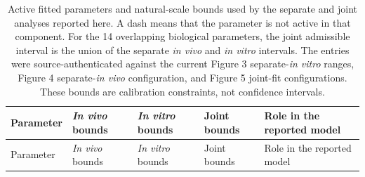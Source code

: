 \begingroup
\scriptsize
\setlength{\tabcolsep}{3pt}
\setlength\LTleft{0pt}
\setlength\LTright{0pt}
\begin{longtable}{@{}p{}p{}p{}p{}p{}@{}}
\caption{Active fitted parameters and natural-scale bounds used by the separate and joint analyses reported here. A dash means that the parameter is not active in that component. For the 14 overlapping biological parameters, the joint admissible interval is the union of the separate \textit{in vivo} and \textit{in vitro} intervals. The entries were source-authenticated against the current Figure 3 separate-\textit{in vitro} ranges, Figure 4 separate-\textit{in vivo} configuration, and Figure 5 joint-fit configurations. These bounds are calibration constraints, not confidence intervals.}
\label{tab:tao_model_parameters}\\

\toprule
Parameter & \textit{In vivo} bounds & \textit{In vitro} bounds & Joint bounds & Role in the reported model \\
\midrule
\endfirsthead

\toprule
Parameter & \textit{In vivo} bounds & \textit{In vitro} bounds & Joint bounds & Role in the reported model \\
\midrule
\endhead


\end{longtable}
